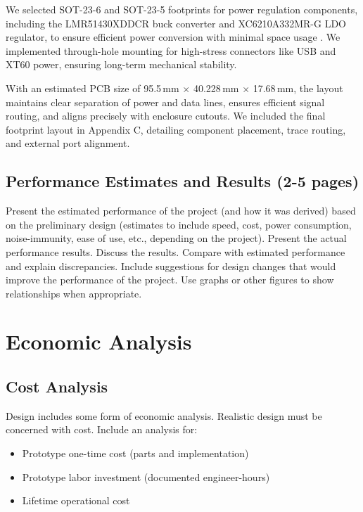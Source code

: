 \documentclass[12pt]{article}
\begin{document}
We selected SOT-23-6 and SOT-23-5 footprints for power regulation components, including the LMR51430XDDCR buck converter and XC6210A332MR-G LDO regulator, to ensure efficient power conversion with minimal space usage \cite{lmr51430} \cite{xc6210}. We implemented through-hole mounting for high-stress connectors like USB and XT60 power, ensuring long-term mechanical stability.

With an estimated PCB size of 95.5\,mm $\times$ 40.228\,mm $\times$ 17.68\,mm, the layout maintains clear separation of power and data lines, ensures efficient signal routing, and aligns precisely with enclosure cutouts. We included the final footprint layout in Appendix C, detailing component placement, trace routing, and external port alignment.

\subsection{Performance Estimates and Results (2-5 pages)}
Present the estimated performance of the project (and how it was derived) based on the preliminary design (estimates to include speed, cost, power consumption, noise-immunity, ease of use, etc., depending on the project). Present the actual performance results. Discuss the results. Compare with estimated performance and explain discrepancies. Include suggestions for design changes that would improve the performance of the project. Use graphs or other figures to show relationships when appropriate.

\section{Economic Analysis}
\subsection{Cost Analysis}
Design includes some form of economic analysis. Realistic design must be concerned with cost. Include an analysis for:
\begin{itemize}[noitemsep]
    \item Prototype one-time cost (parts and implementation)
    \item Prototype labor investment (documented engineer-hours)
    \item Lifetime operational cost
\end{itemize}
\end{document}
